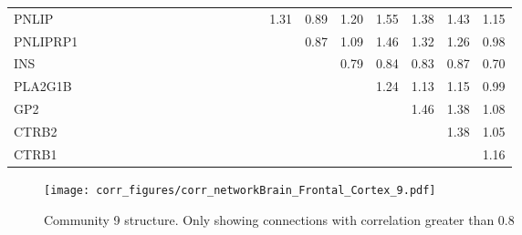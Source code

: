 \begin{longtable}{lrrrrrrrrrrrrrrrrrrrrr}
PNLIP    &              &              &              &             &             &             &            &              &            &            &            &             &           &             &           1.31 &      0.89 &          1.20 &      1.55 &        1.38 &        1.43 &       1.15 \\
PNLIPRP1 &              &              &              &             &             &             &            &              &            &            &            &             &           &             &                &      0.87 &          1.09 &      1.46 &        1.32 &        1.26 &       0.98 \\
INS      &              &              &              &             &             &             &            &              &            &            &            &             &           &             &                &           &          0.79 &      0.84 &        0.83 &        0.87 &       0.70 \\
PLA2G1B  &              &              &              &             &             &             &            &              &            &            &            &             &           &             &                &           &               &      1.24 &        1.13 &        1.15 &       0.99 \\
GP2      &              &              &              &             &             &             &            &              &            &            &            &             &           &             &                &           &               &           &        1.46 &        1.38 &       1.08 \\
CTRB2    &              &              &              &             &             &             &            &              &            &            &            &             &           &             &                &           &               &           &             &        1.38 &       1.05 \\
CTRB1    &              &              &              &             &             &             &            &              &            &            &            &             &           &             &                &           &               &           &             &             &       1.16 \\
\end{longtable}


\begin{figure}[h!]
\centering
\texttt{[image: corr\_figures/corr\_networkBrain\_Frontal\_Cortex\_9.pdf]}
\caption{Community 9 structure. Only showing connections with correlation greater than 0.8}
\end{figure}





